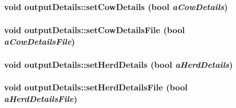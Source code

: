\hypertarget{classoutput_details_a25b50be63d4ac8437a617f3b93e805f5}{
\subsubsection[{setCowDetails}]{\setlength{\rightskip}{0pt plus 5cm}void outputDetails::setCowDetails (bool {\em aCowDetails})}}
\label{classoutput_details_a25b50be63d4ac8437a617f3b93e805f5}
\hypertarget{classoutput_details_ad6829ddb82a9d7a625faf0de1e812881}{
\subsubsection[{setCowDetailsFile}]{\setlength{\rightskip}{0pt plus 5cm}void outputDetails::setCowDetailsFile (bool {\em aCowDetailsFile})}}
\label{classoutput_details_ad6829ddb82a9d7a625faf0de1e812881}
\hypertarget{classoutput_details_a6c941f90992be5aec6e7cbbed93a1a76}{
\subsubsection[{setHerdDetails}]{\setlength{\rightskip}{0pt plus 5cm}void outputDetails::setHerdDetails (bool {\em aHerdDetails})}}
\label{classoutput_details_a6c941f90992be5aec6e7cbbed93a1a76}
\hypertarget{classoutput_details_a782777d55f56959aea269c2a3d53f7b0}{
\subsubsection[{setHerdDetailsFile}]{\setlength{\rightskip}{0pt plus 5cm}void outputDetails::setHerdDetailsFile (bool {\em aHerdDetailsFile})}}
\label{classoutput_details_a782777d55f56959aea269c2a3d53f7b0}
